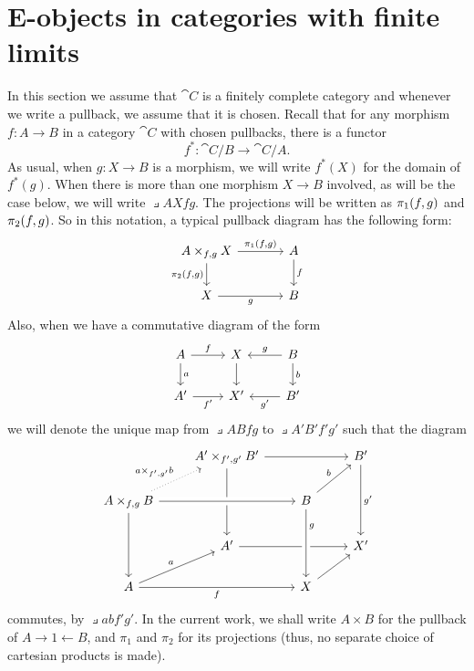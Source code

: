 \section{E-objects in categories with finite limits}
In this section we assume that $\cat{C}$ is a finitely complete category and
whenever we write a pullback, we assume that it is chosen. Recall that for
any morphism $f:A\to B$ in a category $\cat{C}$ with chosen pullbacks, there
is a functor
\begin{equation*}
f^\ast : \cat{C}/B\to\cat{C}/A.
\end{equation*}
As usual, when $g:X\to B$ is a morphism, we will write $f^\ast(X)$ for the
domain of $f^\ast(g)$. When there is more than one morphism $X\to B$ involved,
as will be the case below, we will write $\pullback{A}{X}{f}{g}$. The projections
will be written as $\pi_{1}(f,g)$ and $\pi_{2}(f,g)$. So in this notation, a
typical pullback diagram has the following form:
\begin{equation*}
\begin{tikzcd}[column sep=large]
\pullback{A}{X}{f}{g}
  \ar{r}{\pullbackpr{1}{f}{g}}
  \ar{d}[swap]{\pullbackpr{2}{f}{g}}
  &
A \ar{d}{f}
  \\
X \ar{r}[swap]{g}
  &
B
\end{tikzcd}
\end{equation*}
Also, when we have a commutative diagram of the form
\begin{equation*}
\begin{tikzcd}
A \ar{r}{f}
  \ar{d}{a}
  &
X \ar{d}
  & 
B \ar{l}[swap]{g}
  \ar{d}{b}
  \\
A'
  \ar{r}[swap]{f'}
  &
X'
  &
B'
  \ar{l}{g'}
\end{tikzcd}
\end{equation*}
we will denote the unique map from $\pullback{A}{B}{f}{g}$ to $\pullback{A'}{B'}{f'}{g'}$
such that the diagram
\begin{equation*}
\begin{tikzcd}
  {}
  & 
\pullback{A'}{B'}{f'}{g'}
  \ar{dd}
  \ar{rr}
  &
  &
B'
  \ar{dd}{g'}
  \\
\pullback{A}{B}{f}{g}
  \ar{dd}
  \ar[crossing over]{rr}
  \ar[dotted]{ur}{\pullback{a}{b}{f'}{g'}}
  &
  &
B \ar{ur}{b}
  \\
  {}
  &
A'
  \ar{rr}
  &
  &
X'
  \\
A \ar{rr}[swap]{f}
  \ar{ur}{a}
  &
  &
X \ar[crossing over,leftarrow]{uu}[near end,swap]{g}
  \ar{ur}
\end{tikzcd}
\end{equation*}
commutes, by $\pullback{a}{b}{f'}{g'}$. In the current work, we shall
write $A\times B$ for the pullback of $A\rightarrow 1\leftarrow B$, and
$\pi_1$ and $\pi_2$ for its projections (thus, no separate choice of
cartesian products is made).

